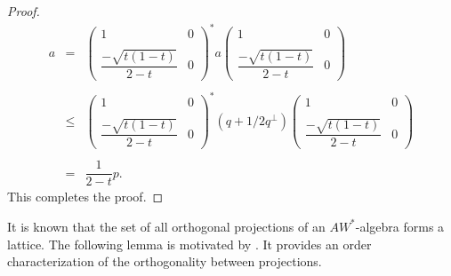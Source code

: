 \documentclass[12pt]{amsart}
\theoremstyle{definition}
\theoremstyle{remark}
\numberwithin{equation}{section}
\begin{document}
\begin{proof}
$$\begin{array}{llllllll}
	a&=&\begin{pmatrix}
		1 & 0 \\ \\
		\dfrac{-\sqrt{t(1-t)}}{2-t} & 0
	\end{pmatrix}^*a\begin{pmatrix}
		1 & 0 \\ \\
		\dfrac{-\sqrt{t(1-t)}}{2-t} & 0
	\end{pmatrix}\\\\
	&\leq& \begin{pmatrix}
		1 & 0 \\ \\
		\dfrac{-\sqrt{t(1-t)}}{2-t} & 0
	\end{pmatrix}^*  (q+1/2q^\perp) \begin{pmatrix}
		1 & 0 \\ \\
		\dfrac{-\sqrt{t(1-t)}}{2-t} & 0
	\end{pmatrix}\\\\
	&=& \dfrac{1}{2-t}p.
\end{array}$$	
This completes the proof.
\end{proof}



It is known that the set of all orthogonal projections of an $AW^*$-algebra forms a lattice.  The following lemma   is motivated by \cite[Proposition 3.9]{Our}. It provides an order characterization of the orthogonality between  projections.
\end{document}
